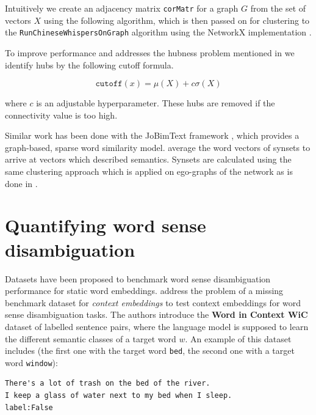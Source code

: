 \documentclass[a4paper,12pt,twoside,openright]{report}
\begin{document}
\hfill \break

Intuitively we create an adjacency matrix \texttt{corMatr} for a graph $G$ from the set of vectors $X$ using the following algorithm, which is then passed on for clustering to the \texttt{RunChineseWhispersOnGraph} algorithm using the NetworkX implementation \cite{hagberg04}.

To improve performance and addresses the hubness problem mentioned in \cite{conneau17} we identify hubs by the following cutoff formula.

\begin{equation}
\texttt{cutoff}(x) = \mu ( X ) + c \sigma (X)
\end{equation}

where $c$ is an adjustable hyperparameter.
These hubs are removed if the connectivity value is too high.

Similar work has been done with the JoBimText framework \cite{biemann13}, which provides a graph-based, sparse word similarity model. 
\cite{remus18} average the word vectors of synsets to arrive at vectors which described semantics.
Synsets are calculated using the same clustering approach which is applied on ego-graphs of the network as is done in \cite{biemann06}.


\section{Quantifying word sense disambiguation}

Datasets have been proposed to benchmark word sense disambiguation performance for static word embeddings\cite{bruni13, hill15}.
\cite{pilehvar19} address the problem of a missing benchmark dataset for \textit{context embeddings} to test context embeddings for word sense disambiguation tasks.
The authors introduce the \textbf{Word in Context WiC} dataset of labelled sentence pairs, where the language model is supposed to learn the different semantic classes of a target word $w$. 
An example of this dataset includes (the first one with the target word \Verb#bed#, the second one with a target word \Verb#window#): \\

\begin{tcolorbox}
\begin{verbatim}
There's a lot of trash on the bed of the river.
I keep a glass of water next to my bed when I sleep.
label:False
\end{verbatim}
\end{tcolorbox}
\end{document}

